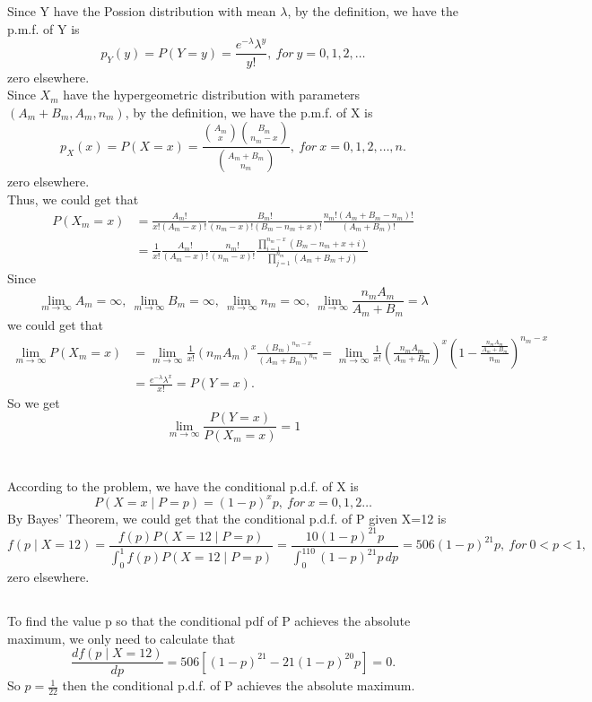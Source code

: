 \documentclass[10.5pt]{article}
\begin{document}
\section{}
Since Y have the Possion distribution with mean $\lambda$, by the definition, we have the p.m.f. of Y is $$p_Y(y)=P(Y=y)=\frac{e^{-\lambda}\lambda^y}{y!},~for ~y=0,1,2,\dots$$\indent
zero elsewhere.\\\indent
Since $X_m$ have the hypergeometric distribution with parameters $(A_m+B_m,A_m,n_m)$, by the definition, we have the p.m.f. of X is $$p_X(x)=P(X=x)=\frac{\binom{A_m}{x}\binom{B_m}{n_m-x}}{\binom{A_m+B_m}{n_m}},~for ~x=0,1,2,\dots,n.$$\indent
zero elsewhere.\\\indent
Thus, we could get that $$\begin{aligned}
    P(X_m=x)&=\frac{A_m!}{x!(A_m-x)!}\frac{B_m!}{(n_m-x)!(B_m-n_m+x)!}\frac{n_m!(A_m+B_m-n_m)!}{(A_m+B_m)!}\\
    &=\frac{1}{x!}\frac{A_m!}{(A_m-x)!}\frac{n_m!}{(n_m-x)!}\frac{\prod_{i=1}^{n_m-x}(B_m-n_m+x+i)}{\prod_{j=1}^{n_m}(A_m+B_m+j)}
\end{aligned}$$\indent
Since $$\lim_{m\to\infty}A_m=\infty,~\lim_{m\to\infty}B_m=\infty,~\lim_{m\to\infty}n_m=\infty,~\lim_{m\to\infty}\frac{n_mA_m}{A_m+B_m}=\lambda$$\indent
we could get that $$\begin{aligned}
    \lim_{m\to\infty}P(X_m=x)&=\lim_{m\to\infty}\frac{1}{x!}(n_mA_m)^x\frac{(B_m)^{n_m-x}}{(A_m+B_m)^{n_m}}=\lim_{m\to\infty}\frac{1}{x!}\left(\frac{n_mA_m}{A_m+B_m}\right)^x\left(1-\frac{\frac{n_mA_m}{A_m+B_m}}{n_m}\right)^{n_m-x}\\
    &=\frac{e^{-\lambda}\lambda^x}{x!}=P(Y=x).
\end{aligned}$$\indent
So we get $$\lim_{m\to\infty}\frac{P(Y=x)}{P(X_m=x)}=1$$

\section{}
\subsection{}
According to the problem, we have the conditional p.d.f. of X is $$P(X=x\mid P=p)=(1-p)^xp,~for~x=0,1,2\dots$$\indent
By Bayes' Theorem, we could get that the conditional p.d.f. of P given X=12 is $$f(p\mid X=12)=\frac{f(p)P(X=12\mid P=p)}{\int_0^1f(p)P(X=12\mid P=p)}=\frac{10(1-p)^{21}p}{\int_0^110(1-p)^{21}p\,dp}=506(1-p)^{21}p,~for ~0<p<1,$$\indent
zero elsewhere.
\subsection{}
To find the value p so that the conditional pdf of P achieves the absolute maximum, we only need to calculate that $$\frac{d f(p\mid X=12)}{dp}=506\left[(1-p)^{21}-21(1-p)^{20}p\right]=0.$$\indent
So $p=\frac{1}{22}$ then the conditional p.d.f. of P achieves the absolute maximum.
\end{document}

